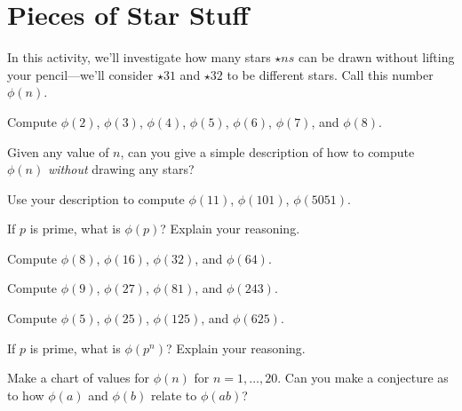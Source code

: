 \newpage
\section{Pieces of Star Stuff}

In this activity, we'll investigate how many stars $\star{n}{s}$ can
be drawn without lifting your pencil---we'll consider $\star{3}{1}$
and $\star{3}{2}$ to be different stars. Call this number $\phi(n)$.

\begin{prob}
Compute $\phi(2)$, $\phi(3)$, $\phi(4)$, $\phi(5)$, $\phi(6)$,
$\phi(7)$, and $\phi(8)$. 
\end{prob}

\begin{prob}
Given any value of $n$, can you give a simple description of how to
compute $\phi(n)$ \textit{without} drawing any stars?
\end{prob}

\begin{prob}
Use your description to compute $\phi(11)$, $\phi(101)$, $\phi(5051)$.
\end{prob}

\begin{prob}
If $p$ is prime, what is $\phi(p)$? Explain your reasoning.
\end{prob}

\begin{prob}
Compute $\phi(8)$, $\phi(16)$, $\phi(32)$, and $\phi(64)$.
\end{prob}

\begin{prob}
Compute $\phi(9)$, $\phi(27)$, $\phi(81)$, and $\phi(243)$.
\end{prob}

\begin{prob}
Compute $\phi(5)$, $\phi(25)$, $\phi(125)$, and $\phi(625)$.
\end{prob}

\begin{prob}
If $p$ is prime, what is $\phi(p^n)$? Explain your reasoning.
\end{prob}

\begin{prob}
Make a chart of values for $\phi(n)$ for $n = 1,\dots, 20$. Can you
make a conjecture as to how $\phi(a)$ and $\phi(b)$ relate to
$\phi(ab)$?
\end{prob}
